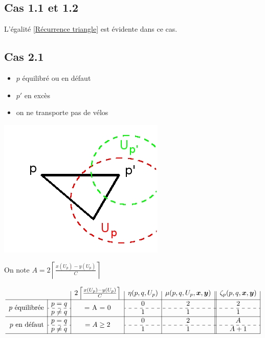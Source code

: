 \documentclass[twoside,11pt,openany,a4paper]{rapport}
\begin{document}
\subsection*{Cas 1.1 et 1.2}

L'égalité \ref{Récurrence triangle} est évidente dans ce cas.

\subsection*{Cas 2.1}

\begin{minipage}{0.5\linewidth}
\begin{itemize}
\item $p$ équilibré ou en défaut
\item $p'$ en excès
\item on ne transporte pas de vélos
\end{itemize}
\end{minipage}
\begin{minipage}{0.5\linewidth}
\begin{center}
\includegraphics[scale=0.5]{graphe_triangulaire_21.jpg}
\end{center}
\end{minipage}

On note $A = 2 \left\lceil \frac{\displaystyle x(U_p)-y(U_p)}{\displaystyle C} \right\rceil$

\begin{gather*}
  \begin{array}{r|c|c|c|c||c|}
    \multicolumn{2}{c|}{}
    & 2 \left\lceil \frac{x(U_p)-y(U_p)}{C} \right\rceil
    & \eta(p,q,U_p)
    & \mu(p,q,U_p,\bs{x},\bs{y})
    & \zeta_p(p,q,\bs{x},\bs{y})
    \\ \hline
    \multirow{2}{*}{$p$ équilibrée}
    & p=q
    & \multirow{2}{*}{= A = 0}
    & 0
    & 2
    & 2
    \\ \cdashline{2-2}\cdashline{4-6}
    & p \ne q
    &
    & 1
    & 1
    & 1
    \\ \hline
    \multirow{2}{*}{$p$ en défaut}
    & p=q
    & \multirow{2}{*}{$= A \ge 2$}
    & 0
    & 2
    & A
    \\ \cdashline{2-2}\cdashline{4-6}
    & p \ne q
    &
    & 1
    & 1
    & A + 1
    \\ \hline
  \end{array}
\end{gather*}
\end{document}
